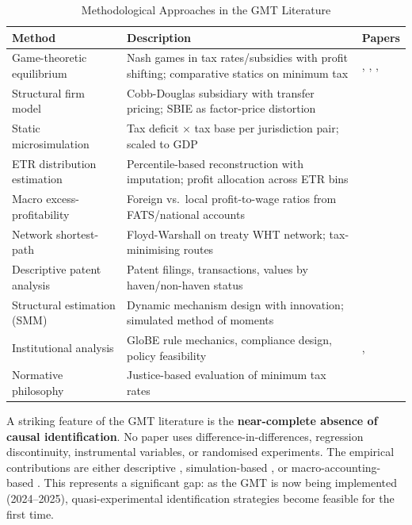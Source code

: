 \documentclass[11pt,a4paper]{article}
\begin{document}
\begin{table}[htbp]
\centering
\small
\caption{Methodological Approaches in the GMT Literature}
\label{tab:methods}
\begin{tabular}{@{}p{3.8cm}p{6.8cm}p{3cm}@{}}
\toprule
\textbf{Method} & \textbf{Description} & \textbf{Papers} \\
\midrule
Game-theoretic equilibrium & Nash games in tax rates/subsidies with profit shifting; comparative statics on minimum tax & \citet{Johannesen2022}, \citet{hebous2023}, \citet{janeba2023}, \citet{hindriks2025} \\[4pt]
Structural firm model & Cobb-Douglas subsidiary with transfer pricing; SBIE as factor-price distortion & \citet{schjelderup2024} \\[4pt]
Static microsimulation & Tax deficit $\times$ tax base per jurisdiction pair; scaled to GDP & \citet{barake2022} \\[4pt]
ETR distribution estimation & Percentile-based reconstruction with imputation; profit allocation across ETR bins & \citet{hugger2025} \\[4pt]
Macro excess-profitability & Foreign vs.\ local profit-to-wage ratios from FATS/national accounts & \citet{torslov2022} \\[4pt]
Network shortest-path & Floyd-Warshall on treaty WHT network; tax-minimising routes & \citet{vantriet2025} \\[4pt]
Descriptive patent analysis & Patent filings, transactions, values by haven/non-haven status & \citet{bilicka2023} \\[4pt]
Structural estimation (SMM) & Dynamic mechanism design with innovation; simulated method of moments & \citet{akcigit2022} \\[4pt]
Institutional analysis & GloBE rule mechanics, compliance design, policy feasibility & \citet{hanlon2023}, \citet{schanz2023} \\[4pt]
Normative philosophy & Justice-based evaluation of minimum tax rates & \citet{cassee2019} \\[4pt]
\bottomrule
\end{tabular}
\end{table}

A striking feature of the GMT literature is the \textbf{near-complete absence of causal identification}. No paper uses difference-in-differences, regression discontinuity, instrumental variables, or randomised experiments. The empirical contributions are either descriptive \citep{bilicka2023,devereux2023}, simulation-based \citep{barake2022,hugger2025}, or macro-accounting-based \citep{torslov2022}. This represents a significant gap: as the GMT is now being implemented (2024--2025), quasi-experimental identification strategies become feasible for the first time.
\end{document}
